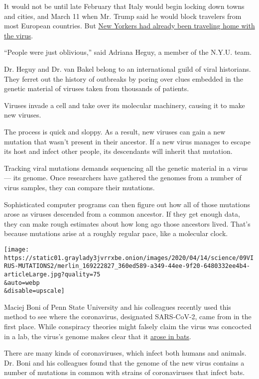 It would not be until late February that Italy would begin locking down
towns and cities, and March 11 when Mr. Trump said he would block
travelers from most European countries. But
\href{https://www.nytimes3xbfgragh.onion/2020/03/19/health/coronavirus-travel-ban.html}{New
Yorkers had already been traveling home with the virus}.

``People were just oblivious,'' said Adriana Heguy, a member of the
N.Y.U. team.

Dr. Heguy and Dr. van Bakel belong to an international guild of viral
historians. They ferret out the history of outbreaks by poring over
clues embedded in the genetic material of viruses taken from thousands
of patients.

Viruses invade a cell and take over its molecular machinery, causing it
to make new viruses.

The process is quick and sloppy. As a result, new viruses can gain a new
mutation that wasn't present in their ancestor. If a new virus manages
to escape its host and infect other people, its descendants will inherit
that mutation.

Tracking viral mutations demands sequencing all the genetic material in
a virus --- its genome. Once researchers have gathered the genomes from
a number of virus samples, they can compare their mutations.

Sophisticated computer programs can then figure out how all of those
mutations arose as viruses descended from a common ancestor. If they get
enough data, they can make rough estimates about how long ago those
ancestors lived. That's because mutations arise at a roughly regular
pace, like a molecular clock.

\texttt{[image: https://static01.graylady3jvrrxbe.onion/images/2020/04/14/science/09VIRUS-MUTATIONS2/merlin\_169222827\_360ed589-a349-44ee-9f20-6480332ee4b4-articleLarge.jpg?quality=75\\\&auto=webp\\\&disable=upscale]}

Maciej Boni of Penn State University and his colleagues recently used
this method to see where the coronavirus, designated SARS-CoV-2, came
from in the first place. While conspiracy theories might falsely claim
the virus was concocted in a lab, the virus's genome makes clear that it
\href{https://www.biorxiv.org/content/10.1101/2020.03.30.015008v1}{arose
in bats}.

There are many kinds of coronaviruses, which infect both humans and
animals. Dr. Boni and his colleagues found that the genome of the new
virus contains a number of mutations in common with strains of
coronaviruses that infect bats.

